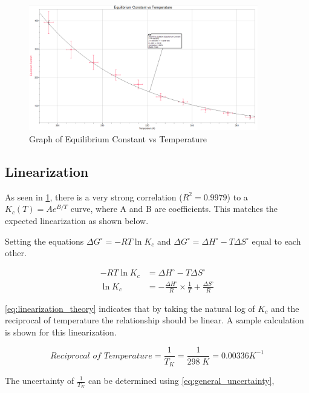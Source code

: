 \begin{figure}[H]
    \centering
    \includegraphics[width=100mm,height=\textheight,keepaspectratio]{images/before_linearization.png}
    \caption{Graph of Equilibrium Constant vs Temperature}
    \label{fig:before_linearization}
\end{figure}


\subsection{Linearization}
As seen in \cref{fig:before_linearization}, there is a very strong correlation (\(R^2=0.9979\)) to a \(K_c(T) = Ae^{B/T}\) curve, where A and B are coefficients. This matches the expected linearization as shown below.

\noindent
\newline
Setting the equations \(\Delta G^\circ = - RT\ln K_c\) and \(\Delta G^\circ = \Delta H^\circ - T \Delta S^\circ\) equal to each other.

\begin{align}
    - RT\ln K_c &= \Delta H^\circ - T \Delta S^\circ \\
    \ln K_c &= - \frac{\Delta H^\circ}{R} \times \frac{1}{T} + \frac{\Delta S^\circ}{R} \label{eq:linearization_theory}
\end{align}

\noindent
\cref{eq:linearization_theory} indicates that by taking the natural log of \(K_c\) and the reciprocal of temperature the relationship should be linear. A sample calculation is shown for this linearization.

\begin{equation}
    \textit{Reciprocal of Temperature} = \frac{1}{T_K} = \frac{1}{298 \; K} = 0.00336 K^{-1}
\end{equation}

\noindent
The uncertainty of \(\frac{1}{T_K}\) can be determined using \cref{eq:general_uncertainty}, 

